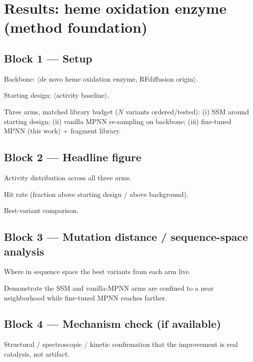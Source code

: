 \section{Results: heme oxidation enzyme (method foundation)}
\label{sec:res:heme}


\subsection*{Block 1 --- Setup}
\begin{planlist}
  \item Backbone: $\langle$de novo heme oxidation enzyme, RFdiffusion
        origin$\rangle$.
  \item Starting design: $\langle$activity baseline$\rangle$.
  \item Three arms, matched library budget ($N$ variants ordered/tested):
        (i) SSM around starting design; (ii) vanilla MPNN re-sampling on
        backbone; (iii) fine-tuned MPNN (this work) + fragment library.
\end{planlist}

\subsection*{Block 2 --- Headline figure}
\begin{planlist}
  \item Activity distribution across all three arms.
  \item Hit rate (fraction above starting design / above background).
  \item Best-variant comparison.
\end{planlist}

\subsection*{Block 3 --- Mutation distance / sequence-space analysis}
\begin{planlist}
  \item Where in sequence space the best variants from each arm live.
  \item Demonstrate the SSM and vanilla-MPNN arms are confined to a near
        neighborhood while fine-tuned MPNN reaches farther.
\end{planlist}

\subsection*{Block 4 --- Mechanism check (if available)}
\begin{planlist}
  \item Structural / spectroscopic / kinetic confirmation that the improvement
        is real catalysis, not artifact.
\end{planlist}
